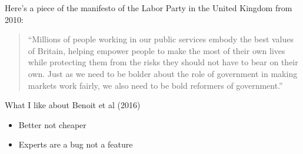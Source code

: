 \documentclass[aspectratio=169]{beamer}
\begin{document}
\begin{frame}

Here's a piece of the manifesto of the Labor Party in the United Kingdom from 2010:

\begin{quote}
``Millions of people working in our public services embody the best values of Britain, helping empower people to make the most of their own lives while protecting them from the risks they should not have to bear on their own. Just as we need to be bolder about the role of government in making markets work fairly, we also need to be bold reformers of government.''
\end{quote}

\end{frame}
\begin{frame}

\begin{center}
\end{center}

\end{frame}
\begin{frame}

What I like about Benoit et al (2016)
\begin{itemize}
\item Better not cheaper
\pause
\item Experts are a bug not a feature
\end{itemize}

\end{frame}
\end{document}
